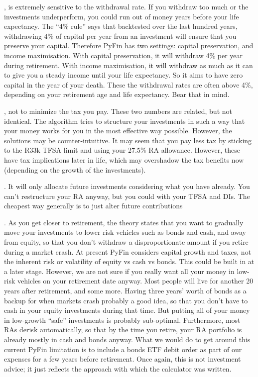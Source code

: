 \documentclass[a4paper, justified]{tufte-handout}
\begin{document}
, is extremely sensitive to the withdrawal rate. If you withdraw too much or the investments underperform, you could run out of money years before your life expectancy. The ``4\% rule'' says that backtested over the last hundred years, withdrawing 4\% of capital per year from an investment will ensure that you preserve your capital. Therefore PyFin has two settings: capital preservation, and income maximisation. With capital preservation, it will withdraw 4\% per year during retirement. With income maximisation, it will withdraw as much as it can to give you a steady income until your life expectancy. So it aims to have zero capital in the year of your death. These the withdrawal rates are often above 4\%, depending on your retirement age and life expectancy. Bear that in mind.

, not to minimize the tax you pay. These two numbers are related, but not identical. The algorithm tries to structure your investments in such a way that your money works for you in the most effective way possible. However, the solutions may be counter-intuitive. It may seem that you pay less tax by sticking to the R33k TFSA limit and using your 27.5\% RA allowance. However, these have tax implications later in life, which may overshadow the tax benefits now (depending on the growth of the investments). 

. It will only allocate future investments considering what you have already. You can't restructure your RA anyway, but you could with your TFSA and DIs. The cheapest way generally is to just alter future contributions

. As you get closer to retirement, the theory states that you want to gradually move your investments to lower risk vehicles such as bonds and cash, and away from equity, so that you don't withdraw a disproportionate amount if you retire during a market crash. At present PyFin considers capital growth and taxes, not the inherent risk or volatility of equity vs cash vs bonds. This could be built in at a later stage. However, we are not sure if you really want all your money in low-risk vehicles on your retirement date anyway. Most people will live for another 20 years after retirement, and some more. Having three years' worth of bonds as a backup for when markets crash probably a good idea, so that you don't have to cash in your equity investments during that time. But putting all of your money in low-growth ``safe'' investments is probably sub-optimal. Furthermore, most RAs derisk automatically, so that by the time you retire, your RA portfolio is already mostly in cash and bonds anyway. What we would do to get around this current PyFin limitation is to include a bonds ETF debit order as part of our expenses for a few years before retirement. Once again, this is not investment advice; it just reflects the approach with which the calculator was written.
\end{document}
